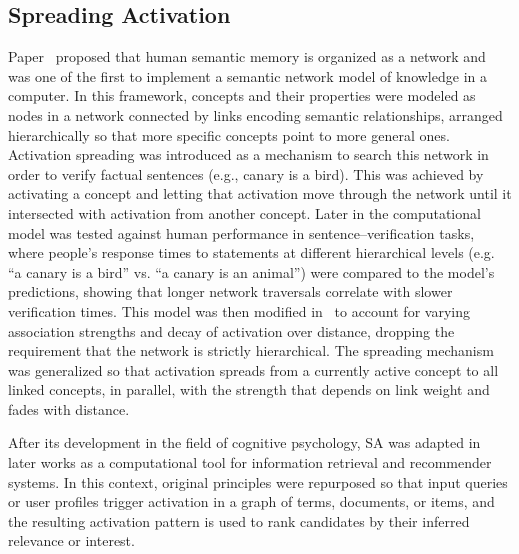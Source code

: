 \documentclass{article}
\begin{document}
\subsection{Spreading Activation}
Paper~\cite{quillian1967word} proposed that human semantic memory is organized as a network and was one of the first to implement a semantic network model of knowledge in a computer. In this framework, concepts and their properties were modeled as nodes in a network connected by links encoding semantic relationships, arranged hierarchically so that more specific concepts point to more general ones. Activation spreading was introduced as a mechanism to search this network in order to verify factual sentences (e.g., canary is a bird). This was achieved by activating a concept and letting that activation move through the network until it intersected with activation from another concept. Later in \cite{collins1969retrieval} the computational model was tested against human performance in sentence–verification tasks, where people’s response times to statements at different hierarchical levels (e.g. “a canary is a bird” vs. “a canary is an animal”) were compared to the model’s predictions, showing that longer network traversals correlate with slower verification times. This model was then modified in~\cite{collins1975spreading, anderson1983spreading} to account for varying association strengths and decay of activation over distance, dropping the requirement that the network is strictly hierarchical. The spreading mechanism was generalized so that activation spreads from a currently active concept to all linked concepts, in parallel, with the strength that depends on link weight and fades with distance.

After its development in the field of cognitive psychology, SA was adapted in later works as a computational tool for information retrieval and recommender systems. In this context, original principles were repurposed so that input queries or user profiles trigger activation in a graph of terms, documents, or items, and the resulting activation pattern is used to rank candidates by their inferred relevance or interest.
\end{document}
